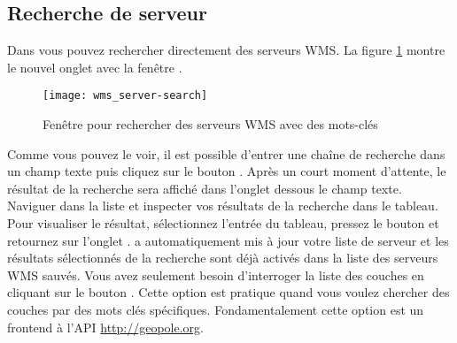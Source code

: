 % 
%
\subsection{Recherche de serveur}
\label{sec:serversearch}

Dans \qg vous pouvez rechercher directement des serveurs WMS.  La figure \ref{fig:searchtab} montre le nouvel onglet  avec la fenêtre .

\begin{figure}[ht]
  \begin{center}
	\texttt{[image: wms\_server-search]}
	\caption{Fenêtre pour rechercher des serveurs WMS avec des mots-clés \nixcaption}\label{fig:searchtab}
  \end{center}
\end{figure}

Comme vous pouvez le voir, il est possible d'entrer une chaîne de recherche dans un champ texte puis cliquez sur le bouton .
Après un court moment d'attente, le résultat de la recherche sera affiché dans l'onglet dessous le champ texte.
Naviguer dans la liste et inspecter vos résultats de la recherche dans le tableau. Pour visualiser le résultat, sélectionnez l'entrée du tableau, pressez le bouton  et retournez sur l'onglet .
\qg a automatiquement mis à jour votre liste de serveur et les résultats sélectionnés de la recherche sont déjà activés dans la liste des serveurs WMS sauvés.
Vous avez seulement besoin d'interroger la liste des couches en cliquant sur le bouton .
Cette option est pratique quand vous voulez chercher des couches par des mots clés spécifiques.
Fondamentalement cette option est un frontend à l'API \url{http://geopole.org}.

